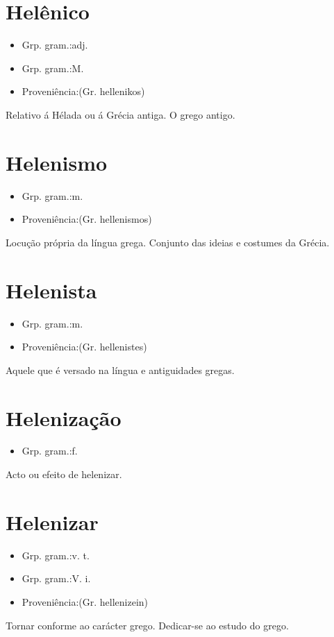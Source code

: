 \documentclass{article}
\begin{document}
\section{Helênico}
\begin{itemize}
\item {Grp. gram.:adj.}
\end{itemize}
\begin{itemize}
\item {Grp. gram.:M.}
\end{itemize}
\begin{itemize}
\item {Proveniência:(Gr. \textunderscore hellenikos\textunderscore )}
\end{itemize}
Relativo á Hélada ou á Grécia antiga.
O grego antigo.
\section{Helenismo}
\begin{itemize}
\item {Grp. gram.:m.}
\end{itemize}
\begin{itemize}
\item {Proveniência:(Gr. \textunderscore hellenismos\textunderscore )}
\end{itemize}
Locução própria da língua grega.
Conjunto das ideias e costumes da Grécia.
\section{Helenista}
\begin{itemize}
\item {Grp. gram.:m.}
\end{itemize}
\begin{itemize}
\item {Proveniência:(Gr. \textunderscore hellenistes\textunderscore )}
\end{itemize}
Aquele que é versado na língua e antiguidades gregas.
\section{Helenização}
\begin{itemize}
\item {Grp. gram.:f.}
\end{itemize}
Acto ou efeito de helenizar.
\section{Helenizar}
\begin{itemize}
\item {Grp. gram.:v. t.}
\end{itemize}
\begin{itemize}
\item {Grp. gram.:V. i.}
\end{itemize}
\begin{itemize}
\item {Proveniência:(Gr. \textunderscore hellenizein\textunderscore )}
\end{itemize}
Tornar conforme ao carácter grego.
Dedicar-se ao estudo do grego.
\end{document}

